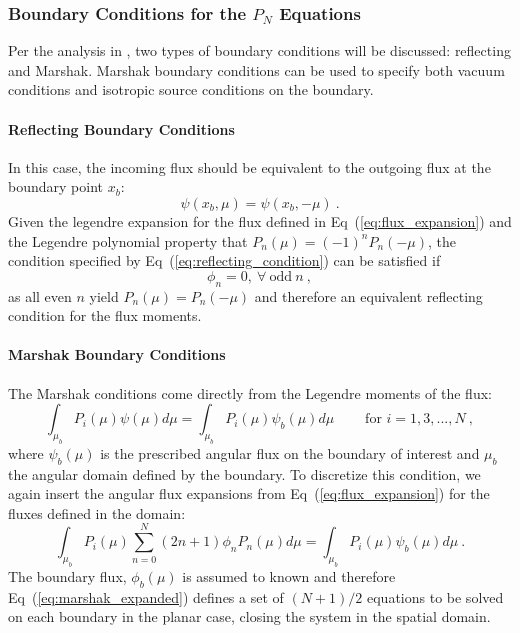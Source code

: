 \documentclass[letterpaper,12pt]{article}
\begin{document}
\subsubsection{Boundary Conditions for the $P_N$ Equations}
\label{subsbusec:bcs_pn}
Per the analysis in \cite{lewis_computational_1993}, two types of
boundary conditions will be discussed: reflecting and Marshak. Marshak
boundary conditions can be used to specify both vacuum conditions and
isotropic source conditions on the boundary.

\paragraph{Reflecting Boundary Conditions}
In this case, the incoming flux should be equivalent to the outgoing
flux at the boundary point $x_b$:
\begin{equation}
  \psi(x_b,\mu) = \psi(x_b,-\mu)\:.
  \label{eq:reflecting_condition}
\end{equation}
Given the legendre expansion for the flux defined in
Eq~(\ref{eq:flux_expansion}) and the Legendre polynomial property that
$P_n(\mu) = (-1)^n P_n(-\mu)$, the condition specified by
Eq~(\ref{eq:reflecting_condition}) can be satisfied if
\begin{equation}
  \phi_n = 0,\ \forall \ \text{odd}\ n\:,
  \label{eq:reflecting_condition_odd}
\end{equation}
as all even $n$ yield $P_n(\mu) = P_n(-\mu)$ and therefore an
equivalent reflecting condition for the flux moments.

\paragraph{Marshak Boundary Conditions}
The Marshak conditions come directly from the Legendre moments of the
flux:
\begin{equation}
  \int_{\mu_b} P_i(\mu) \psi(\mu) d\mu = \int_{\mu_b} P_i(\mu)
  \psi_b(\mu) d\mu\ \ \ \ \ \ \ \ \ \ \text{for $i=1,3,...,N$}\:,
  \label{eq:general_marshak}
\end{equation}
where $\psi_b(\mu)$ is the prescribed angular flux on the boundary of
interest and $\mu_b$ the angular domain defined by the boundary. To
discretize this condition, we again insert the angular flux expansions
from Eq~(\ref{eq:flux_expansion}) for the fluxes defined in the
domain:
\begin{equation}
  \int_{\mu_b} P_i(\mu) \sum_{n=0}^N (2n+1) \phi_n P_n(\mu) d\mu =
  \int_{\mu_b} P_i(\mu) \psi_b(\mu) d\mu\:.
  \label{eq:marshak_expanded}
\end{equation}
The boundary flux, $\phi_b(\mu)$ is assumed to known and therefore
Eq~(\ref{eq:marshak_expanded}) defines a set of $(N+1)/2$ equations to
be solved on each boundary in the planar case, closing the system in
the spatial domain.
\end{document}
